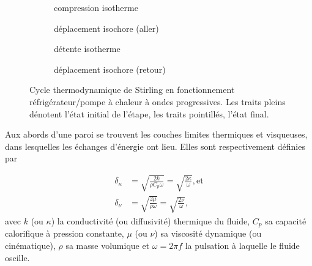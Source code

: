 \begin{figure}[!ht]
	\centering
	\begin{subfigure}{.47\textwidth}
		\centering
		
		\caption{compression isotherme}
		\label{fig:CycleStirling_Comp}
	\end{subfigure}
	\begin{subfigure}{.47\textwidth}
		\centering
		
		\caption{déplacement isochore (aller)}
		\label{fig:CycleStirling_DepIsoch1}
	\end{subfigure}
	\begin{subfigure}{.47\textwidth}
		\centering
		
		\caption{détente isotherme}
		\label{fig:CycleStirling_Detente}
	\end{subfigure}
	\begin{subfigure}{.47\textwidth}
		\centering
		
		\caption{déplacement isochore (retour)}
		\label{fig:CycleStirling_DepIsoch2}
	\end{subfigure}	
	\caption[Cycle de Stirling des machines à ondes progressives]{Cycle thermodynamique de Stirling en fonctionnement réfrigérateur/pompe à chaleur à ondes progressives. Les traits pleins dénotent l'état initial de l'étape, les traits pointillés, l'état final.}
	\label{fig:CycleStirling}
\end{figure} %



Aux abords d'une paroi se trouvent les couches limites thermiques et visqueuses, dans lesquelles les échanges d'énergie ont lieu. Elles sont respectivement définies par

\begin{subequations}
	\begin{align}
		\delta_{\kappa} &= \sqrt{\frac{2 k}{\rho C_p \omega}} = \sqrt{\frac{2 \kappa}{\omega}}, \text{et}	\label{eq:CouchesLimites_Thermique}\\
		\delta_{\nu} &= \sqrt{\frac{2 \mu}{\rho \omega}} = \sqrt{\frac{2 \nu}{\omega}},	\label{eq:CouchesLimites_Visqueuse}
	\end{align}
	\label{eq:CouchesLimites}%
\end{subequations}
avec $k$ (ou $\kappa$) la conductivité (ou diffusivité) thermique du fluide, $C_p$ sa capacité calorifique à pression constante, $\mu$ (ou $\nu$) sa viscosité dynamique (ou cinématique), $\rho$ sa masse volumique et $\omega = 2\pi f$ la pulsation à laquelle le fluide oscille.

